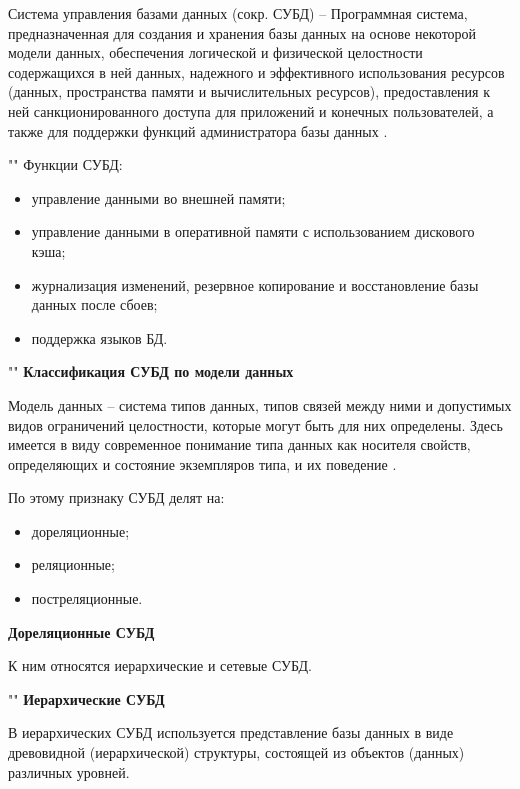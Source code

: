 \documentclass[a4paper]{bmstu}
\begin{document}
Система управления базами данных (сокр. СУБД) -- Программная система, предназначенная для создания и хранения базы данных на основе некоторой модели данных, обеспечения логической и физической целостности содержащихся в ней данных, надежного и эффективного использования ресурсов (данных, пространства памяти и вычислительных ресурсов), предоставления к ней санкционированного доступа для приложений и конечных пользователей, а также для поддержки 
функций администратора базы данных \cite{kogal}.

""\newline
Функции СУБД:

\begin{itemize}
	\setlength\itemsep{0.01em}
	\item управление данными во внешней памяти;
	\item управление данными в оперативной памяти с использованием дискового кэша;
	\item журнализация изменений, резервное копирование и восстановление базы данных после сбоев;
	\item поддержка языков БД.
\end{itemize}

""\newline
\noindent\textbf{Классификация СУБД по модели данных}

Модель данных --  система типов данных, типов связей между ними и допустимых видов ограничений целостности, которые могут быть для них определены. Здесь имеется в виду современное понимание типа данных как носителя свойств, определяющих и состояние экземпляров типа, и их поведение \cite{kogal}.

По этому признаку СУБД делят на:

\begin{itemize}
	\setlength\itemsep{0.01em}
	\item дореляционные;
	\item реляционные;
	\item постреляционные.
\end{itemize}


\newpage
\noindent\textbf{Дореляционные СУБД}

К ним относятся иерархические и сетевые СУБД.

""\newline
\noindent\textbf{Иерархические СУБД}

В иерархических СУБД используется представление базы данных в виде древовидной (иерархической) структуры, состоящей из объектов (данных) различных уровней.
\end{document}
